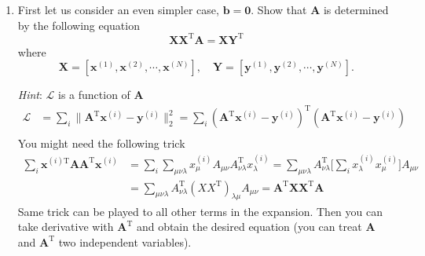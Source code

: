 \documentclass[a4paper,twoside, 10pt]{article}
\theoremstyle{wick}
\newcommand{\tr}{\textrm}
\newcommand{\mat}[1]{\mathbf{#1}}
\begin{document}
	\begin{enumerate}
		\item First let us consider an even simpler case, $\bm{b} = \bm{0}$. Show that $\mat{A}$ is determined by the following equation
		\begin{equation}
			\mat{X} \mat{X}^{\tr{T}} \mat{A}
				= \mat{X} \mat{Y}^{\tr{T}}
		\end{equation}
		where
		\begin{equation}
			\mat{X}
				= [\bm{x}^{(1)}, \bm{x}^{(2)}, \cdots{}, \bm{x}^{(N)}],\quad{}
			\mat{Y}
				= [\bm{y}^{(1)}, \bm{y}^{(2)}, \cdots{}, \bm{y}^{(N)}].
		\end{equation}

		\textit{Hint}: $\mathcal{L}$ is a function of $\mat{A}$
		\begin{equation}	\label{eq:lsloss}
		\begin{split}
			\mathcal{L}
				&= \sum_i \| \mat{A}^{\tr{T}} \bm{x}^{(i)} - \bm{y}^{(i)} \|^2_2
				= \sum_i (\mat{A}^{\tr{T}} \bm{x}^{(i)} - \bm{y}^{(i)})^{\tr{T}}
				(\mat{A}^{\tr{T}} \bm{x}^{(i)} - \bm{y}^{(i)})	\\
				\iffalse
				&= \mat{A}^{\tr{T}} \bigg[\sum_{i} \bm{x}^{(i)} \bm{x}^{(i)\tr{T}}\bigg] \mat{A}
				- \mat{A}^{\tr{T}} \bigg[\sum_{i} \bm{x}^{(i)} \bm{y}^{(i)\tr{T}}\bigg]
				- \bigg[\sum_{i} \bm{y}^{(i)} \bm{x}^{(i)\tr{T}} \bigg] \mat{A}
				+ \sum_i \bm{y}^{(i)\tr{T}} \bm{y}^{(i)}
				\fi
		\end{split}
		\end{equation}
		You might need the following trick
		\begin{equation}
		\begin{split}
			\sum_i \bm{x}^{(i)\tr{T}} \mat{A} \mat{A}^{\tr{T}} \bm{x}^{(i)}
				&= \sum_i \sum_{\mu\nu\lambda} x^{(i)}_{\mu} A_{\mu\nu}
				A^{\tr{T}}_{\nu\lambda} x^{(i)}_{\lambda}
				= \sum_{\mu\nu\lambda} A^{\tr{T}}_{\nu\lambda} \bigg[\sum_i x^{(i)}_{\lambda}
				x^{(i)}_{\mu}\bigg] A_{\mu\nu}	\\
				&= \sum_{\mu\nu\lambda} A^{\tr{T}}_{\nu\lambda} (XX^{\tr{T}})_{\lambda \mu} A_{\mu\nu}
				= \mat{A}^{\tr{T}} \mat{X} \mat{X}^{\tr{T}} \mat{A}
		\end{split}
		\end{equation}
		Same trick can be played to all other terms in the expansion. Then you can take derivative with $\mat{A}^{\tr{T}}$ and obtain the desired equation (you can treat $\mat{A}$ and $\mat{A}^{\tr{T}}$ two independent variables).


\end{enumerate}
\end{document}

